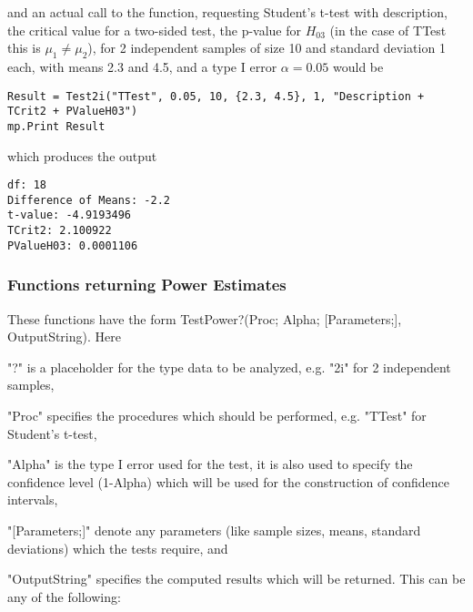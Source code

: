\vspace{0.3cm}
and an actual call to the function, requesting Student's t-test with description, the critical value for a two-sided test, the p-value for $H_{03}$ (in the case of \textsf{TTest} this is $\mu_1 \neq \mu_2$), for 2 independent samples of size 10 and standard deviation 1 each, with means 2.3 and 4.5, and a type I error $\alpha=0.05$ would be

\begin{lstlisting}
Result = Test2i("TTest", 0.05, 10, {2.3, 4.5}, 1, "Description + TCrit2 + PValueH03")
mp.Print Result
\end{lstlisting}
which produces the output

\begin{verbatim}
df: 18
Difference of Means: -2.2
t-value: -4.9193496
TCrit2: 2.100922
PValueH03: 0.0001106
\end{verbatim}




\newpage
\subsubsection{Functions returning Power Estimates}
\label{Functions returning Power Estimates}
These functions have the form \textsf{TestPower?(Proc; Alpha; [Parameters;], OutputString)}.
Here 

"?" is a placeholder for the type data to be analyzed, e.g. "2i" for 2 independent samples, 

"Proc" specifies the procedures which should be performed, e.g. "TTest" for Student's t-test, 

"Alpha" is the type I error used for the test, it is also used to specify the confidence level (1-Alpha) which will be used for the construction of confidence intervals, 


"[Parameters;]" denote any parameters (like sample sizes, means, standard deviations) which the tests require, and 

"OutputString" specifies the computed results which will be returned. This can be any of the following:


